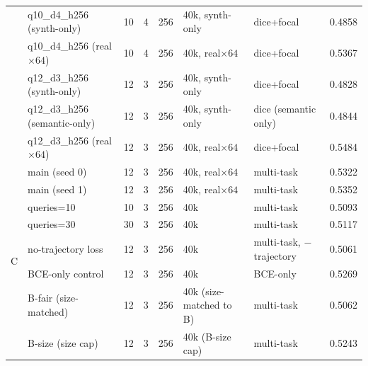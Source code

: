 \documentclass{article}
\begin{document}
\begin{table}[h]
\begin{tabular}{llcccp{2.5cm}p{2.4cm}r}
 & q10\_d4\_h256 (synth-only)          & 10 & 4 & 256 & 40k, synth-only          & dice+focal & 0.4858 \\
 & q10\_d4\_h256 (real$\times 64$)     & 10 & 4 & 256 & 40k, real$\times 64$     & dice+focal & 0.5367 \\
 & q12\_d3\_h256 (synth-only)          & 12 & 3 & 256 & 40k, synth-only          & dice+focal & 0.4828 \\
 & q12\_d3\_h256 (semantic-only)       & 12 & 3 & 256 & 40k, synth-only          & dice (semantic only) & 0.4844 \\
 & q12\_d3\_h256 (real$\times 64$)     & 12 & 3 & 256 & 40k, real$\times 64$     & dice+focal & 0.5484 \\
\midrule
\multirow{8}{*}{C}
 & main (seed 0)                        & 12 & 3 & 256 & 40k, real$\times 64$     & multi-task & 0.5322 \\
 & main (seed 1)                        & 12 & 3 & 256 & 40k, real$\times 64$     & multi-task & 0.5352 \\
 & queries=10                           & 10 & 3 & 256 & 40k                       & multi-task & 0.5093 \\
 & queries=30                           & 30 & 3 & 256 & 40k                       & multi-task & 0.5117 \\
 & no-trajectory loss                   & 12 & 3 & 256 & 40k                       & multi-task, $-$ trajectory & 0.5061 \\
 & BCE-only control                     & 12 & 3 & 256 & 40k                       & BCE-only       & 0.5269 \\
 & B-fair (size-matched)                & 12 & 3 & 256 & 40k (size-matched to B)  & multi-task & 0.5062 \\
 & B-size (size cap)                    & 12 & 3 & 256 & 40k (B-size cap)         & multi-task & 0.5243 \\
\bottomrule
\end{tabular}
\end{table}
\end{document}
